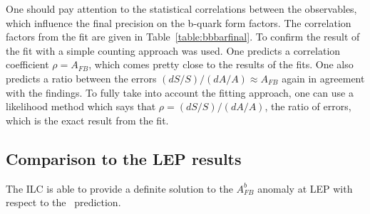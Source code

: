 One should pay attention to the statistical correlations between the observables, which influence the final precision on the b-quark form factors. 
The correlation factors from the fit are given in Table~\ref{table:bbbarfinal}. To confirm the result of the fit with a simple counting approach was used. One predicts a correlation coefficient $\rho = A_{FB}$, which comes pretty close to the results of the fits. One also predicts a ratio 
between the errors $(dS/S)/(dA/A)\approx A_{FB}$ again in agreement with the findings. To fully take into  account the fitting approach, one can use a likelihood method which says that $\rho=(dS/S)/(dA/A)$, 
the ratio of errors, which is the exact result from the fit. 


\subsection{Comparison to the LEP results}
\label{sec:NewResults}
The ILC is able to provide a definite solution to the $A_{FB}^b$ anomaly at LEP with respect to the \sm\ prediction.


